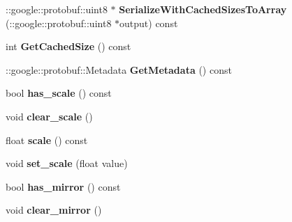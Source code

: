 \begin{DoxyCompactItemize}
\mbox{\label{classcaffe_1_1_transformation_parameter_a1d3c0ce80d9476e3e564e5dcc262fee9}} 
\+::google\+::protobuf\+::uint8 $\ast$ {\bfseries Serialize\+With\+Cached\+Sizes\+To\+Array} (\+::google\+::protobuf\+::uint8 $\ast$output) const
\item 
\mbox{\label{classcaffe_1_1_transformation_parameter_a2bd6ed5fe1d21fa334a653c5155a3d52}} 
int {\bfseries Get\+Cached\+Size} () const
\item 
\mbox{\label{classcaffe_1_1_transformation_parameter_a57505e92f122c91cad0eea0513eb9eb6}} 
\+::google\+::protobuf\+::\+Metadata {\bfseries Get\+Metadata} () const
\item 
\mbox{\label{classcaffe_1_1_transformation_parameter_a5c8c8b008ef1d7c3be84ea7e237a4fee}} 
bool {\bfseries has\+\_\+scale} () const
\item 
\mbox{\label{classcaffe_1_1_transformation_parameter_a7673e6ebf08bdea8088e3a1c771ab056}} 
void {\bfseries clear\+\_\+scale} ()
\item 
\mbox{\label{classcaffe_1_1_transformation_parameter_ae44a63e4ce468d5de118eb4e33bfcca7}} 
float {\bfseries scale} () const
\item 
\mbox{\label{classcaffe_1_1_transformation_parameter_af93bb2722dffac1c0dcfe1d37a228ab6}} 
void {\bfseries set\+\_\+scale} (float value)
\item 
\mbox{\label{classcaffe_1_1_transformation_parameter_a079f416db9fce574be300207da102aa5}} 
bool {\bfseries has\+\_\+mirror} () const
\item 
\mbox{\label{classcaffe_1_1_transformation_parameter_a64bfe8dee9c12e741c7e82fd0dbbd3ad}} 
void {\bfseries clear\+\_\+mirror} ()
\item 
\mbox{\label{classcaffe_1_1_transformation_parameter_a4ac30173a483b2a418a41cb5b2d42a8d}} 

\end{DoxyCompactItemize}
